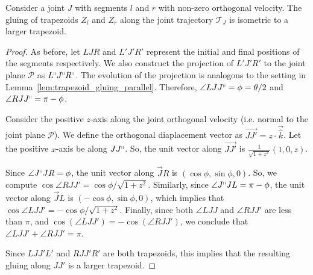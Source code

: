 
\begin{lemma}
\label{lem:trapezoid_gluing}
Consider a joint $J$ with segments $l$ and $r$ with non-zero orthogonal velocity.
The gluing of trapezoids $Z_l$ and $Z_r$ along the joint trajectory $\mathcal T_J$ is isometric to a larger trapezoid.
\end{lemma}
\begin{proof}
As before, let $LJR$ and $L'J'R'$ represent the initial and final positions of the segments respectively.
We also construct the projection of $L'J'R'$ to the joint plane $\mathcal P$ as $L^\shortparallel J^\shortparallel R^\shortparallel$.
The evolution of the projection is analogous to the setting in Lemma~\ref{lem:trapezoid_gluing_parallel}.
Therefore, $\angle LJJ^\shortparallel = \phi = \theta/2$ and $\angle RJJ^\shortparallel = \pi-\phi$.

Consider the positive $z$-axis along the joint orthogonal velocity (i.e. normal to the joint plane $\mathcal P$).
We define the orthogonal diaplacement vector as $\overrightarrow{JJ'} = z\cdot\vec{\hat k}$.
Let the positive $x$-axis be along $JJ^\shortparallel$. So, the unit vector along $\overrightarrow{JJ'}$ is $\frac{1}{\sqrt{1+z^2}}(1,0,z)$.

Since $\angle J^\shortparallel JR = \phi$, the unit vector along $\overrightarrow JR$ is $(\cos\phi,\sin\phi,0)$.
So, we compute $\cos \angle RJJ' = \cos\phi/\sqrt{1+z^2}$.
Similarly, since $\angle J^\shortparallel JL = \pi-\phi$, the unit vector along $\overrightarrow JL$ is $(-\cos\phi,\sin\phi,0)$,
which implies that $\cos \angle LJJ' = -\cos\phi/\sqrt{1+z^2}$.
Finally, since both $\angle LJJ$ and $\angle RJJ'$ are less than $\pi$, and $\cos\left(\angle LJJ' \right) = -\cos\left(\angle RJJ' \right)$,
we conclude that $\angle LJJ' + \angle RJJ' = \pi$.

Since $LJJ'L'$ and $RJJ'R'$ are both trapezoids, this implies that the resulting gluing along $JJ'$ is a larger trapezoid.
\end{proof}

